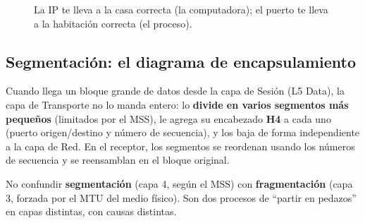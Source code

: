 \documentclass[11pt,a4paper]{article}
\begin{document}
\begin{figure}[h]
\centering
{}
\caption{La IP te lleva a la casa correcta (la computadora); el puerto te lleva a la habitación correcta (el proceso).}
\end{figure}

\subsection*{Segmentación: el diagrama de encapsulamiento}
Cuando llega un bloque grande de datos desde la capa de Sesión (L5 Data), la capa de Transporte no lo manda entero: lo \textbf{divide en varios segmentos más pequeños} (limitados por el MSS), le agrega su encabezado \textbf{H4} a cada uno (puerto origen/destino y número de secuencia), y los baja de forma independiente a la capa de Red. En el receptor, los segmentos se reordenan usando los números de secuencia y se reensamblan en el bloque original.

\begin{examfact}
No confundir \textbf{segmentación} (capa 4, según el MSS) con \textbf{fragmentación} (capa 3, forzada por el MTU del medio físico). Son dos procesos de ``partir en pedazos'' en capas distintas, con causas distintas.
\end{examfact}
\end{document}
